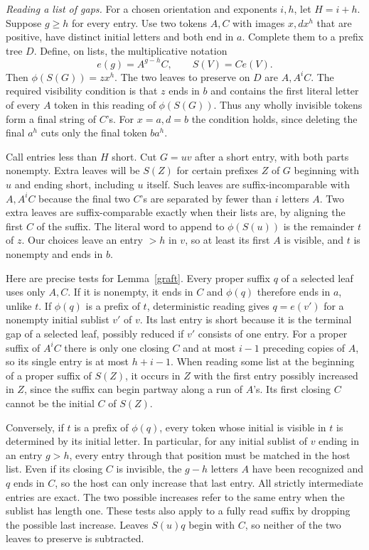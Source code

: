 \documentclass[11pt,a4paper]{article}
\newcommand{\parhead}[1]{\par\smallskip\noindent\textit{#1.}\enspace}
\begin{document}
\parhead{Reading a list of gaps}
For a chosen orientation and exponents $i,h$, let $H=i+h$. Suppose $g\ge h$ for every entry. Use two tokens $A,C$ with images $x,dx^h$ that are positive, have distinct initial letters and both end in $a$. Complete them to a prefix tree $D$. Define, on lists, the multiplicative notation
\[
 e(g)=A^{g-h}C,\qquad S(V)=C e(V).
\]
Then $\phi(S(G))=z x^h$. The two leaves to preserve on $D$ are $A,A^i C$. The required visibility condition is that $z$ ends in $b$ and contains the first literal letter of every $A$ token in this reading of $\phi(S(G))$. Thus any wholly invisible tokens form a final string of $C$'s. For $x=a,d=b$ the condition holds, since deleting the final $a^h$ cuts only the final token $ba^h$.

Call entries less than $H$ short. Cut $G=u v$ after a short entry, with both parts nonempty. Extra leaves will be $S(Z)$ for certain prefixes $Z$ of $G$ beginning with $u$ and ending short, including $u$ itself. Such leaves are suffix-incomparable with $A,A^i C$ because the final two $C$'s are separated by fewer than $i$ letters $A$. Two extra leaves are suffix-comparable exactly when their lists are, by aligning the first $C$ of the suffix. The literal word to append to $\phi(S(u))$ is the remainder $t$ of $z$. Our choices leave an entry $>h$ in $v$, so at least its first $A$ is visible, and $t$ is nonempty and ends in $b$.

Here are precise tests for Lemma~\ref{graft}. Every proper suffix $q$ of a selected leaf uses only $A,C$. If it is nonempty, it ends in $C$ and $\phi(q)$ therefore ends in $a$, unlike $t$. If $\phi(q)$ is a prefix of $t$, deterministic reading gives $q=e(v')$ for a nonempty initial sublist $v'$ of $v$. Its last entry is short because it is the terminal gap of a selected leaf, possibly reduced if $v'$ consists of one entry. For a proper suffix of $A^i C$ there is only one closing $C$ and at most $i-1$ preceding copies of $A$, so its single entry is at most $h+i-1$. When reading some list at the beginning of a proper suffix of $S(Z)$, it occurs in $Z$ with the first entry possibly increased in $Z$, since the suffix can begin partway along a run of $A$'s. Its first closing $C$ cannot be the initial $C$ of $S(Z)$.

Conversely, if $t$ is a prefix of $\phi(q)$, every token whose initial is visible in $t$ is determined by its initial letter. In particular, for any initial sublist of $v$ ending in an entry $g>h$, every entry through that position must be matched in the host list. Even if its closing $C$ is invisible, the $g-h$ letters $A$ have been recognized and $q$ ends in $C$, so the host can only increase that last entry. All strictly intermediate entries are exact. The two possible increases refer to the same entry when the sublist has length one. These tests also apply to a fully read suffix by dropping the possible last increase. Leaves $S(u)q$ begin with $C$, so neither of the two leaves to preserve is subtracted.
\end{document}
